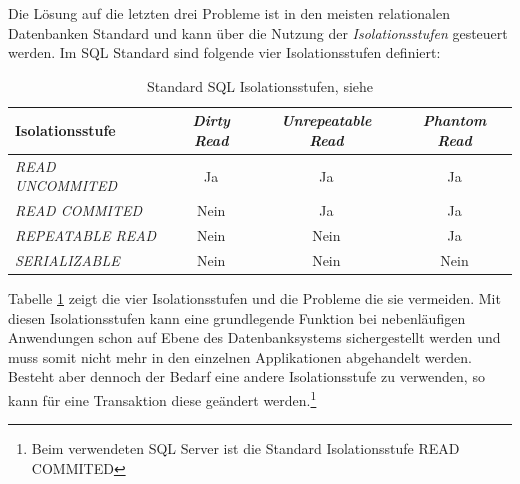 Die Lösung auf die letzten drei Probleme ist in den meisten relationalen Datenbanken Standard und kann über die Nutzung der \emph{Isolationsstufen} gesteuert werden. Im SQL Standard sind folgende vier Isolationsstufen definiert:
\begin{table}[]
	\centering
\begin{tabular}{|l|c|c|c|}
	\hline 
	\textbf{Isolationsstufe}& \textit{Dirty Read} & \textit{Unrepeatable Read} & \textit{Phantom Read} \\ 
	\hline 
	\textit{READ UNCOMMITED}& Ja & Ja & Ja \\ 
	\hline 
	\textit{READ COMMITED}& Nein & Ja  & Ja \\ 
	\hline 
	\textit{REPEATABLE READ}& Nein & Nein & Ja \\ 
	\hline 
	\textit{SERIALIZABLE}& Nein & Nein & Nein \\ 
	\hline 
\end{tabular} 
\caption{Standard SQL Isolationsstufen, siehe \parencite[S. 440]{dbgrund}}
\label{table:isolationlevel}
\end {table}
Tabelle \ref{table:isolationlevel} zeigt die vier Isolationsstufen und die Probleme die sie vermeiden. Mit diesen Isolationsstufen kann eine grundlegende Funktion bei nebenläufigen Anwendungen schon auf Ebene des Datenbanksystems sichergestellt werden und muss somit nicht mehr in den einzelnen Applikationen abgehandelt werden. Besteht aber dennoch der Bedarf eine andere Isolationsstufe zu verwenden, so kann für eine Transaktion diese geändert werden.\footnote{Beim verwendeten SQL Server ist die Standard Isolationsstufe READ COMMITED\parencite{ms_isolation}}
\chapterend
